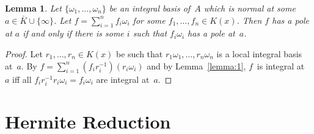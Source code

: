 \documentclass{sig-alternate}
\newtheorem{lemma}[theorem]{Lemma}
\begin{document}
\begin{lemma}\label{lemma:3}
  Let $\{\omega_1,\dots,\omega_n\}$ be an integral basis of~$A$
  which is normal at some $a\in\bar K\cup\{\infty\}$.
  Let $f=\sum_{i=1}^n f_i\omega_i$ for some $f_1,\dots,f_n\in K(x)$.
  Then $f$ has a pole at $a$ if and only if
  there is some $i$ such that $f_i\omega_i$ has a pole at~$a$.
\end{lemma}
\begin{proof}
  Let $r_1,\dots,r_n\in K(x)$ be such that $r_1\omega_1,\dots,r_n\omega_n$ is a
  local integral basis at~$a$. By $f=\sum_{i=1}^n
  (f_ir_i^{-1})(r_i\omega_i)$ and by Lemma~\ref{lemma:1}, $f$~is integral at~$a$ iff all
  $f_ir_i^{-1}r_i\omega_i=f_i\omega_i$ are integral at~$a$.
\end{proof}

\section{Hermite Reduction}\label{sec:hermite}

\end{document}
